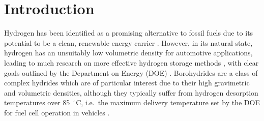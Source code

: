 \documentclass[twocolumn, prb, showpacs]{revtex4-1}
\begin{document}


\maketitle


\section{Introduction}\label{sec:introduction}


Hydrogen has been identified as a promising alternative to fossil fuels due to
its potential to be a clean, renewable energy carrier
\cite{Kunowsky_2013:material_demands, Durbin_2013:review_hydrogen,
Crabtree_2004:hydrogen_economy}. However, in its natural state, hydrogen has an
unsuitably low volumetric density for automotive applications, leading to much
research on more effective hydrogen storage methods
\cite{Harrison_2015:materials_hydrogen,Ahluwalia_2012:on-board_off-board}, with
clear goals outlined by the Department on Energy (DOE)
\cite{Yang_2010:high_capacity, DOE_Targets_Onboard_2009}. Borohydrides are a
class of complex hydrides which are of particular interest due to their high gravimetric
and volumetric densities, although they typically suffer from hydrogen
desorption temperatures over 85~$^\circ$C, i.e.\ the maximum delivery
temperature set by the DOE for fuel cell operation in vehicles
\cite{Yang_2010:high_capacity, Graetz_2009:new_approaches,
Ronnebro_2011:development_group, Li_2011:recent_progress,
Rude_2011:tailoring_properties,
Jain_2010:novel_hydrogen,Orimo_2007:complex_hydrides,Umegaki_2009:boron-_nitrogen-based,George_2010:structural_stability}.
\end{document}
